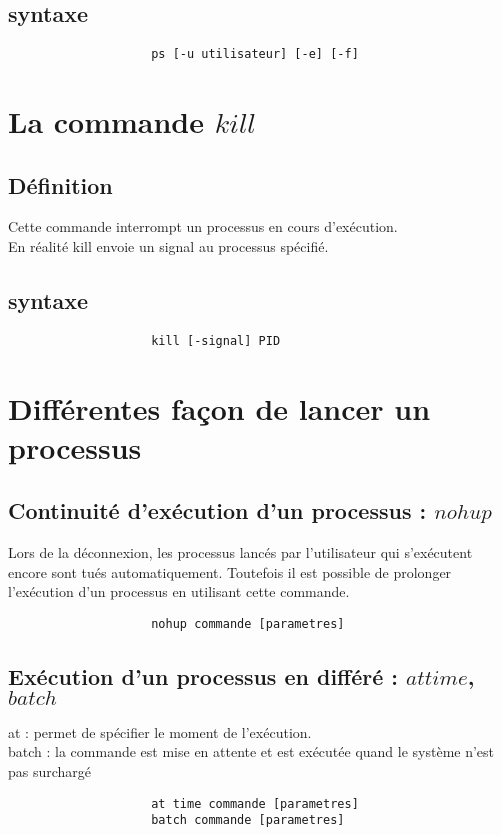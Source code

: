 			\subsection{syntaxe}
				\begin{verbatim}
					ps [-u utilisateur] [-e] [-f]
				\end{verbatim}	

		\section{La commande $kill$}
			\subsection{Définition}
				Cette commande interrompt un processus en cours d'exécution.\\
				En réalité kill envoie un signal au processus spécifié.
			\subsection{syntaxe}
				\begin{verbatim}
					kill [-signal] PID 
				\end{verbatim}		

		\section{Différentes façon de lancer un processus}
			\subsection{Continuité d'exécution d'un processus : $nohup$}
				Lors de la déconnexion, les processus lancés par l'utilisateur qui s'exécutent encore sont tués automatiquement. Toutefois il est possible de 	prolonger l'exécution d'un processus en utilisant cette commande.

				\begin{verbatim}
					nohup commande [parametres]
				\end{verbatim}		

		\subsection{Exécution d'un processus en différé : $at time$, $batch$}
			at : permet de spécifier le moment de l'exécution. \\
				batch : la commande est mise en attente et est exécutée quand le système n'est pas surchargé
				\begin{verbatim}
					at time commande [parametres]
					batch commande [parametres]
				\end{verbatim}		

